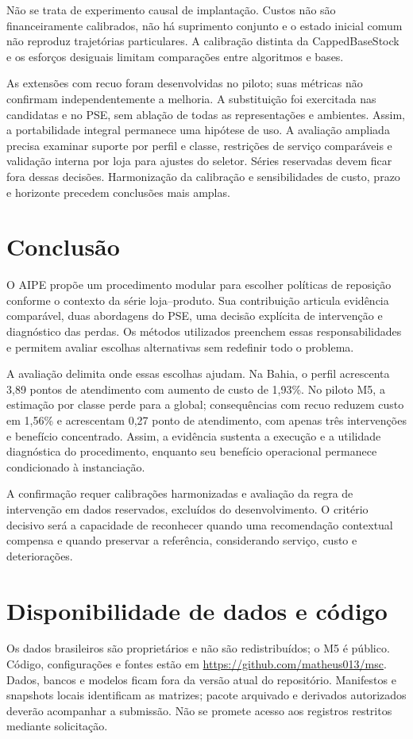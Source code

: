 \documentclass[preprint,12pt]{elsarticle}
\begin{document}
Não se trata de experimento causal de implantação. Custos não são financeiramente calibrados, não há suprimento conjunto e o estado inicial comum não reproduz trajetórias particulares. A calibração distinta da CappedBaseStock e os esforços desiguais limitam comparações entre algoritmos e bases.

As extensões com recuo foram desenvolvidas no piloto; suas métricas não confirmam independentemente a melhoria. A substituição foi exercitada nas candidatas e no PSE, sem ablação de todas as representações e ambientes. Assim, a portabilidade integral permanece uma hipótese de uso. A avaliação ampliada precisa examinar suporte por perfil e classe, restrições de serviço comparáveis e validação interna por loja para ajustes do seletor. Séries reservadas devem ficar fora dessas decisões. Harmonização da calibração e sensibilidades de custo, prazo e horizonte precedem conclusões mais amplas.

\section{Conclusão}
O AIPE propõe um procedimento modular para escolher políticas de reposição conforme o contexto da série loja--produto. Sua contribuição articula evidência comparável, duas abordagens do PSE, uma decisão explícita de intervenção e diagnóstico das perdas. Os métodos utilizados preenchem essas responsabilidades e permitem avaliar escolhas alternativas sem redefinir todo o problema.

A avaliação delimita onde essas escolhas ajudam. Na Bahia, o perfil acrescenta 3,89 pontos de atendimento com aumento de custo de 1,93\%. No piloto M5, a estimação por classe perde para a global; consequências com recuo reduzem custo em 1,56\% e acrescentam 0,27 ponto de atendimento, com apenas três intervenções e benefício concentrado. Assim, a evidência sustenta a execução e a utilidade diagnóstica do procedimento, enquanto seu benefício operacional permanece condicionado à instanciação.

A confirmação requer calibrações harmonizadas e avaliação da regra de intervenção em dados reservados, excluídos do desenvolvimento. O critério decisivo será a capacidade de reconhecer quando uma recomendação contextual compensa e quando preservar a referência, considerando serviço, custo e deteriorações.

\section*{Disponibilidade de dados e código}
Os dados brasileiros são proprietários e não são redistribuídos; o M5 é público. Código, configurações e fontes estão em \url{https://github.com/matheus013/msc}. Dados, bancos e modelos ficam fora da versão atual do repositório. Manifestos e snapshots locais identificam as matrizes; pacote arquivado e derivados autorizados deverão acompanhar a submissão. Não se promete acesso aos registros restritos mediante solicitação.
\end{document}
